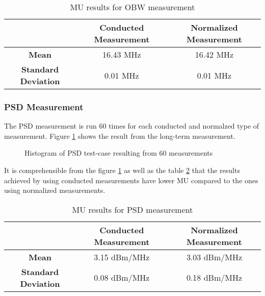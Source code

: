 \begin{table}[H]
  \centering
\begin {tabular} {|c|c|c|} 
\toprule
 & \textbf{Conducted Measurement} & \textbf{Normalized Measurement} \\ 
\midrule 
\textbf{Mean} & 16.43 MHz & 16.42 MHz\\
\textbf{Standard Deviation} & 0.01 MHz & 0.01 MHz\\
\bottomrule
 \end{tabular}
  \caption{\acf{MU} results for \acs{OBW} measurement} \label{tab:tab1}
\end{table}

\subsubsection{\acf{PSD} Measurement}
The \acs{PSD} measurement is run 60 times for each conducted and normalzed type of measurement. Figure
\ref{fig:otavscond2} shows the result from the long-term measurement.
\begin{figure}[H]
\centering
{}
\caption{Histogram of \acs{PSD} test-case resulting from 60 measurements }
\label{fig:otavscond2} 
\end{figure}
It is comprehensible from the figure \ref{fig:otavscond2} as well as the table \ref{tab:tab2} that the results achieved by using conducted measurements have lower \acs{MU} compared to the ones using normalized measurements.
\begin{table}[H]
  \centering
\begin {tabular} {|c|c|c|} 
\toprule
 & \textbf{Conducted Measurement} & \textbf{Normalized Measurement} \\ 
\midrule 
\textbf{Mean} & 3.15 dBm/MHz & 3.03 dBm/MHz\\
\textbf{Standard Deviation} & 0.08 dBm/MHz & 0.18 dBm/MHz\\
\bottomrule
 \end{tabular}
  \caption{\acf{MU} results for \acs{PSD} measurement} \label{tab:tab2}
\end{table}



